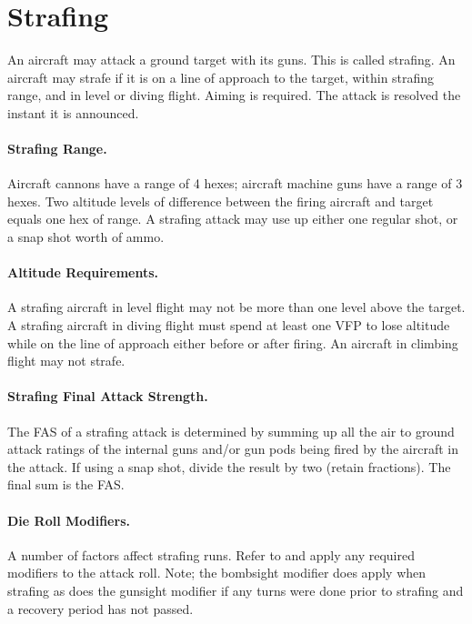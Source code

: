 

\section{Strafing}
\label{rule:strafing}

An aircraft may attack a ground target with its guns. This is called strafing. An aircraft may strafe if it is on a line of approach to the target, within strafing range, and in level or diving flight. Aiming is required. The attack is resolved the instant it is announced.

\paragraph{Strafing Range.} Aircraft cannons have a range of 4 hexes; aircraft machine guns have a range of 3 hexes. Two altitude levels of difference between the firing aircraft and target equals one hex of range. A strafing attack may use up either one regular shot, or a snap shot worth of ammo.

\paragraph{Altitude Requirements.} A strafing aircraft in level flight may not be more than one level above the target. A strafing aircraft in diving flight must spend at least one VFP to lose altitude while on the line of approach either before or after firing. An aircraft in climbing flight may not strafe.

\paragraph{Strafing Final Attack Strength.} The FAS of a strafing attack is determined by summing up all the air to ground attack ratings of the internal guns and/or gun pods being fired by the aircraft in the attack. If using a snap shot, divide the result by two (retain fractions). The final sum is the FAS.

\paragraph{Die Roll Modifiers.} A number of factors affect strafing runs. Refer to  and apply any required modifiers to the attack roll. Note; the bombsight modifier does apply when strafing as does the gunsight modifier if any turns were done prior to strafing and a recovery period has not passed.

